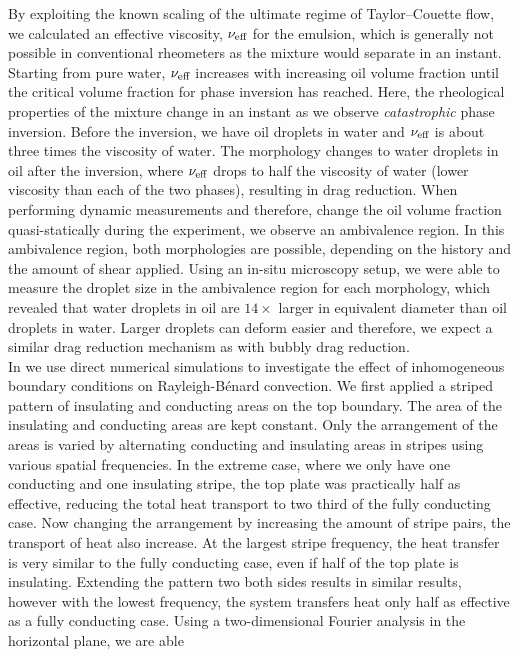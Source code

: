 By exploiting the known scaling of the ultimate regime of Taylor--Couette flow,
we calculated an effective viscosity, $\nu_\text{eff}$ for the emulsion, which is
generally not possible in conventional rheometers as the mixture would
separate in an instant.
Starting from pure water, $\nu_\text{eff}$ increases with increasing oil volume fraction
until the critical volume fraction for phase inversion has reached.
Here, the rheological properties of the mixture change in an instant as we
observe \emph{catastrophic} phase inversion.
Before the inversion, we have oil droplets in water and $\nu_\text{eff}$ is about three
times the viscosity of water.
The morphology changes to water droplets in oil after the inversion, where
$\nu_\text{eff}$ drops to half the viscosity of water (lower viscosity than each of the
two phases), resulting in drag reduction.
When performing dynamic measurements and therefore, change the oil volume
fraction quasi-statically during the experiment, we observe an ambivalence region.
In this ambivalence region, both morphologies are possible, depending on  the
history and the
amount of shear applied.
Using an in-situ microscopy setup, we were able to measure the droplet size in
the ambivalence region for each morphology, which revealed that water droplets
in oil are $14\times$ larger in equivalent diameter than oil droplets in water.
Larger droplets can deform easier and therefore, we expect a similar drag
reduction mechanism as with bubbly drag reduction.\\
\indent In  we use direct numerical simulations to
investigate the effect of inhomogeneous boundary conditions on
Rayleigh-B\'enard convection.
We first applied a striped pattern of insulating and conducting areas on the 
top boundary.
The area of the insulating and conducting areas are kept constant.
Only the arrangement of the areas is varied by alternating conducting and
insulating areas in stripes using various spatial frequencies.
In the extreme case, where we only have one conducting and one insulating
stripe, the top plate was practically half as effective, reducing the total
heat transport to two third of the fully conducting case.
Now changing the arrangement by increasing the amount of stripe pairs, the
transport of heat also increase.
At the largest stripe frequency, the heat transfer is very similar to the
fully conducting case, even if half of the top plate is insulating.
Extending the pattern two both sides results in similar results, however with
the lowest frequency, the system transfers heat only half as effective as a
fully conducting case.
Using a two-dimensional Fourier analysis in the horizontal plane, we are able
